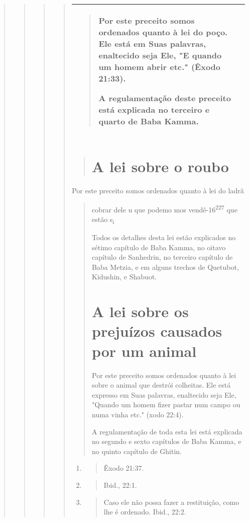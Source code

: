 \begin{quote}
\begin{quote}
\begin{quote}
\begin{quote}
\begin{longtable}[]{@{}ll@{}}
\begin{minipage}[t]{0.47\columnwidth}
\begin{quote}
Por este preceito somos ordenados quanto à lei do poço. Ele está em Suas
palavras, enaltecido seja Ele, "E quando um homem abrir etc." (Êxodo
21:33).

A regulamentação deste preceito está explicada no terceiro e quarto de
Baba Kamma.
\end{quote}\strut
\end{minipage}\tabularnewline
\bottomrule
\end{longtable}

\begin{quote}
\section{A lei sobre o roubo}
\end{quote}

Por este preceito somos ordenados quanto à lei do ladrã

\begin{quote}
cobrar dele u que podemo mos vendê-16\textsuperscript{227} que estão
s\textsubscript{i}

Todos os detalhes desta lei estão explicados no sétimo capítulo de Baba
Kamma, no oitavo capítulo de Sanhedrin, no terceiro capítulo de Baba
Metzia, e em alguns trechos de Quetubot, Kidushin, e Shabuot.

\section{A lei sobre os prejuízos causados por um animal}

Por este preceito somos ordenados quanto à lei sobre o animal que
destrói colheitas. Ele está expresso em Suas palavras, enaltecido seja
Ele, "Quan­do um homem fizer pastar num campo ou numa vinha etc." (xodo
22:4).

A regulamentação de toda esta lei está explicada no segundo e sexto
capítulos de Baba Kamma, e no quinto capítulo de Ghitin.
\end{quote}

\begin{enumerate}
\def\labelenumi{\arabic{enumi}.}
\setcounter{enumi}{224}
\item
 \begin{quote}
 Êxodo 21:37.
 \end{quote}
\item
 \begin{quote}
 Ibid., 22:1.
 \end{quote}
\item
 \begin{quote}
 Caso ele não possa fazer a restituição, como lhe é ordenado. Ibid.,
 22:2.
 \end{quote}
\end{enumerate}


\end{quote}
\end{quote}
\end{quote}
\end{quote}
